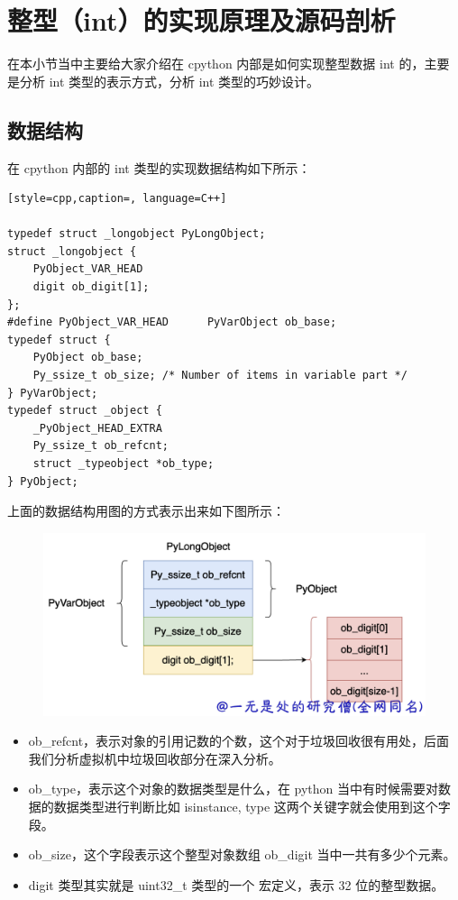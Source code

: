 \section{整型（int）的实现原理及源码剖析}
在本小节当中主要给大家介绍在 cpython 内部是如何实现整型数据 int 的，主要是分析 int 类型的表示方式，分析 int 类型的巧妙设计。
\subsection{数据结构}
在 cpython 内部的 int 类型的实现数据结构如下所示：
\begin{lstlisting}[style=cpp,caption=, language=C++]

typedef struct _longobject PyLongObject;
struct _longobject {
	PyObject_VAR_HEAD
	digit ob_digit[1];
};
#define PyObject_VAR_HEAD      PyVarObject ob_base;
typedef struct {
    PyObject ob_base;
    Py_ssize_t ob_size; /* Number of items in variable part */
} PyVarObject;
typedef struct _object {
    _PyObject_HEAD_EXTRA
    Py_ssize_t ob_refcnt;
    struct _typeobject *ob_type;
} PyObject;
\end{lstlisting}
上面的数据结构用图的方式表示出来如下图所示：

    \begin{figure}[H]
        \centering
            \includegraphics[scale=.2]{images/22-int.png}
            \caption{ }
        \label{fig:my_label}
    \end{figure}
    
\begin{itemize}
\item ob\_refcnt，表示对象的引用记数的个数，这个对于垃圾回收很有用处，后面我们分析虚拟机中垃圾回收部分在深入分析。 
\item ob\_type，表示这个对象的数据类型是什么，在 python 当中有时候需要对数据的数据类型进行判断比如 isinstance, type 这两个关键字就会使用到这个字段。 
\item ob\_size，这个字段表示这个整型对象数组 ob\_digit 当中一共有多少个元素。 
\item digit 类型其实就是 uint32\_t 类型的一个 宏定义，表示 32 位的整型数据。 
\end{itemize}
